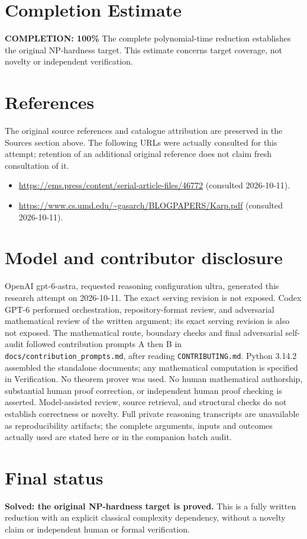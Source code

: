 \documentclass[11pt]{article}
\begin{document}
\section{Completion Estimate}
\noindent\textbf{COMPLETION: 100\%}
The complete polynomial-time reduction establishes the original NP-hardness target.
This estimate concerns target coverage, not novelty or independent verification.
\section{References}
The original source references and catalogue attribution are preserved in the
Sources section above. The following URLs were actually consulted for this attempt;
retention of an additional original reference does not claim fresh consultation of it.
\begin{itemize}
\item \url{https://ems.press/content/serial-article-files/46772} (consulted 2026-10-11). 
\item \url{https://www.cs.umd.edu/~gasarch/BLOGPAPERS/Karp.pdf} (consulted 2026-10-11). 
\end{itemize}
\section{Model and contributor disclosure}
OpenAI gpt-6-astra, requested reasoning configuration ultra, generated this research
attempt on 2026-10-11. The exact serving revision is not exposed. Codex GPT-6
performed orchestration, repository-format review, and adversarial mathematical review of the written argument; its exact serving revision
is also not exposed. The mathematical route, boundary checks and final adversarial
self-audit followed contribution prompts A then B in
\texttt{docs/contribution\_prompts.md}, after reading \texttt{CONTRIBUTING.md}.
Python 3.14.2 assembled the standalone documents; any mathematical computation is
specified in Verification. No theorem prover was used. No human mathematical
authorship, substantial human proof correction, or independent human proof checking
is asserted. Model-assisted review, source retrieval, and structural checks do not
establish correctness or novelty. Full private reasoning transcripts are unavailable
as reproducibility artifacts; the complete arguments, inputs and outcomes actually
used are stated here or in the companion batch audit.
\section{Final status}
\textbf{Solved: the original NP-hardness target is proved.} This is a fully written
reduction with an explicit classical complexity dependency, without a novelty claim
or independent human or formal verification.
\end{document}
